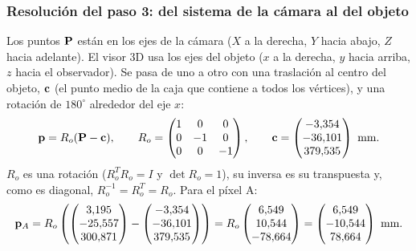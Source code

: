 \subsubsection{Resolución del paso 3: del sistema de la cámara al del objeto}\label{sec:casco-ejes}

Los puntos $\mathbf{P}$ están en los ejes de la cámara ($X$ a la derecha, $Y$ hacia abajo, $Z$ hacia adelante). El visor 3D usa los ejes
del objeto ($x$ a la derecha, $y$ hacia arriba, $z$ hacia el observador). Se pasa de uno a otro con una traslación al centro del
objeto, $\mathbf{c}$ (el punto medio de la caja que contiene a todos los vértices), y una rotación de $180^\circ$ alrededor del eje $x$:
\begin{equation}
\mathbf{p}=R_o(\mathbf{P}-\mathbf{c}),\qquad R_o=\begin{pmatrix} 1 & 0 & 0 \\ 0 & -1 & 0 \\ 0 & 0 & -1 \end{pmatrix},\qquad \mathbf{c}=\begin{pmatrix} -3{,}354 \\ -36{,}101 \\ 379{,}535 \end{pmatrix}\ \text{mm}.
\end{equation}
$R_o$ es una rotación ($R_o^TR_o=I$ y $\det R_o=1$), su inversa es su transpuesta y, como es diagonal, $R_o^{-1}=R_o^T=R_o$. Para el píxel A:
\begin{equation}
\mathbf{p}_A=R_o\left(\begin{pmatrix} 3{,}195 \\ -25{,}557 \\ 300{,}871 \end{pmatrix}-\begin{pmatrix} -3{,}354 \\ -36{,}101 \\ 379{,}535 \end{pmatrix}\right)=R_o\begin{pmatrix} 6{,}549 \\ 10{,}544 \\ -78{,}664 \end{pmatrix}=\begin{pmatrix} 6{,}549 \\ -10{,}544 \\ 78{,}664 \end{pmatrix}\ \text{mm}.
\end{equation}

